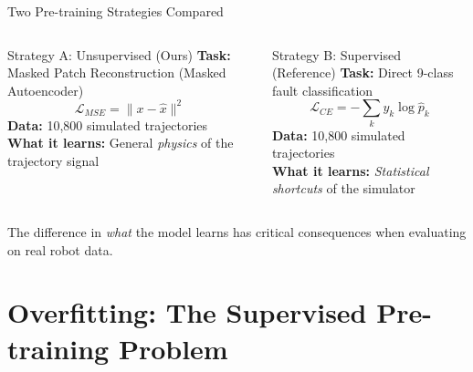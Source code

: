 \documentclass{beamer}
\begin{document}
\begin{frame}{Two Pre-training Strategies Compared}

    \begin{columns}
        \begin{block}{Strategy A: Unsupervised (Ours)}
            \textbf{Task:} Masked Patch Reconstruction (Masked Autoencoder)
            \[
                \mathcal{L}_{MSE} = \|x - \hat{x}\|^2
            \]
            \textbf{Data:} 10,800 simulated trajectories\\
            \textbf{What it learns:} General \textit{physics} of the trajectory signal
        \end{block}

        \begin{alertblock}{Strategy B: Supervised (Reference)}
            \textbf{Task:} Direct 9-class fault classification
            \[
                \mathcal{L}_{CE} = -\sum_k y_k \log \hat{p}_k
            \]
            \textbf{Data:} 10,800 simulated trajectories\\
            \textbf{What it learns:} \textit{Statistical shortcuts} of the simulator
        \end{alertblock}
    \end{columns}

    \vspace{0.3cm}
    \centering
    The difference in \textit{what} the model learns has critical consequences when evaluating on real robot data.
\end{frame}

\section{Overfitting: The Supervised Pre-training Problem}
\end{document}
